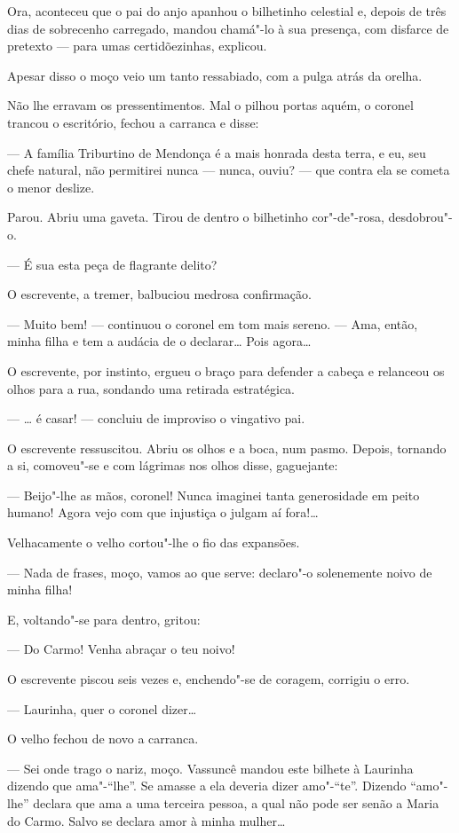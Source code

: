 Ora, aconteceu que o pai do anjo apanhou o bilhetinho celestial e,
depois de três dias de sobrecenho carregado, mandou chamá"-lo à sua
presença, com disfarce de pretexto --- para umas certidõezinhas,
explicou.

Apesar disso o moço veio um tanto ressabiado, com a pulga atrás da
orelha.

Não lhe erravam os pressentimentos. Mal o pilhou portas aquém, o coronel
trancou o escritório, fechou a carranca e disse:

--- A família Triburtino de Mendonça é a mais honrada desta terra, e eu,
seu chefe natural, não permitirei nunca --- nunca, ouviu? --- que contra
ela se cometa o menor deslize.

Parou. Abriu uma gaveta. Tirou de dentro o bilhetinho cor"-de"-rosa,
desdobrou"-o.

--- É sua esta peça de flagrante delito?

O escrevente, a tremer, balbuciou medrosa confirmação.

--- Muito bem! --- continuou o coronel em tom mais sereno. --- Ama,
então, minha filha e tem a audácia de o declarar\ldots{} Pois agora\ldots{}

O escrevente, por instinto, ergueu o braço para defender a cabeça e
relanceou os olhos para a rua, sondando uma retirada estratégica.

--- \ldots{} é casar! --- concluiu de improviso o vingativo pai.

O escrevente ressuscitou. Abriu os olhos e a boca, num pasmo. Depois,
tornando a si, comoveu"-se e com lágrimas nos olhos disse, gaguejante:

--- Beijo"-lhe as mãos, coronel! Nunca imaginei tanta generosidade em
peito humano! Agora vejo com que injustiça o julgam aí fora!\ldots{}

Velhacamente o velho cortou"-lhe o fio das expansões.

--- Nada de frases, moço, vamos ao que serve: declaro"-o solenemente
noivo de minha filha!

E, voltando"-se para dentro, gritou:

--- Do Carmo! Venha abraçar o teu noivo!

O escrevente piscou seis vezes e, enchendo"-se de coragem, corrigiu o
erro.

--- Laurinha, quer o coronel dizer\ldots{}

O velho fechou de novo a carranca.

--- Sei onde trago o nariz, moço. Vassuncê mandou este bilhete à
Laurinha dizendo que ama"-``lhe''. Se amasse a ela deveria dizer
amo"-``te''. Dizendo ``amo"-lhe'' declara que ama a uma terceira pessoa, a
qual não pode ser senão a Maria do Carmo. Salvo se declara amor à minha
mulher\ldots{}

